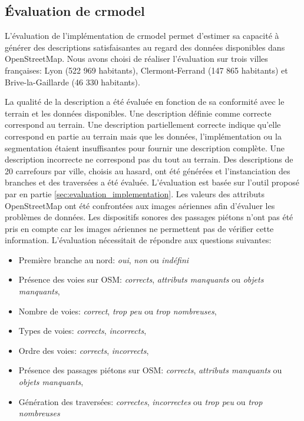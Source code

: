 \subsection{Évaluation de crmodel}

L'évaluation de l'implémentation de crmodel permet d'estimer sa capacité à générer des descriptions satisfaisantes au regard des données disponibles dans OpenStreetMap. Nous avons choisi de réaliser l'évaluation sur trois villes françaises: Lyon (522 969 habitants), Clermont-Ferrand (147 865 habitants) et Brive-la-Gaillarde (46 330 habitants).

\newpar{}

La qualité de la description a été évaluée en fonction de sa conformité avec le terrain et les données disponibles. Une description définie comme correcte correspond au terrain. Une description partiellement correcte indique qu'elle correspond en partie au terrain mais que les données, l'implémentation ou la segmentation étaient insuffisantes pour fournir une description complète. Une description incorrecte ne correspond pas du tout au terrain. Des descriptions de 20 carrefours par ville, choisis au hasard, ont été générées et l'instanciation des branches et des traversées a été évaluée. L'évaluation est basée sur l'outil proposé par en partie \ref{sec:evaluation_implementation}. Les valeurs des attributs OpenStreetMap ont été confrontées aux images aériennes afin d'évaluer les problèmes de données. Les dispositifs sonores des passages piétons n'ont pas été pris en compte car les images aériennes ne permettent pas de vérifier cette information. L'évaluation nécessitait de répondre aux questions suivantes:
\begin{itemize}
    \item Première branche au nord: \textit{oui}, \textit{non} ou \textit{indéfini}
    \item Présence des voies sur OSM: \textit{corrects}, \textit{attributs manquants} ou \textit{objets manquants},
    \item Nombre de voies: \textit{correct}, \textit{trop peu} ou \textit{trop nombreuses},
    \item Types de voies: \textit{corrects}, \textit{incorrects},
    \item Ordre des voies: \textit{corrects}, \textit{incorrects},
    \item Présence des passages piétons sur OSM: \textit{corrects}, \textit{attributs manquants} ou \textit{objets manquants},
    \item Génération des traversées: \textit{correctes}, \textit{incorrectes} ou \textit{trop peu} ou \textit{trop nombreuses}
\end{itemize}

